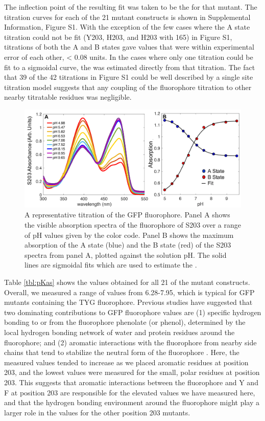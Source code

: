 The inflection point of the resulting fit was taken to be the \pKa{} for that mutant.
The titration curves for each of the 21 mutant constructs is shown in Supplemental Information, Figure S1.
With the exception of the few cases where the A state titration could not be fit (Y203, H203, and H203 with \pCNF{} 165) in Figure S1, titrations of both the A and B states gave \pKa{} values that were within experimental error of each other, < 0.08 \pKa{} units.
In the cases where only one titration could be fit to a sigmoidal curve, the \pKa{} was estimated directly from that titration.
The fact that 39 of the 42 titrations in Figure S1 could be well described by a single site titration model suggests that any coupling of the fluorophore titration to other nearby titratable residues was negligible. 

\begin{figure}
    \center
    \includegraphics[width=\double]{figures-gfp-pKa/absorption_titrations.png}
    \caption{
        A representative titration of the GFP fluorophore. 
        Panel A shows the visible absorption spectra of the fluorophore of S203 over a range of pH values given by the color code. 
        Panel B shows the maximum absorption of the A state (blue) and the B state (red) of the S203 spectra from panel A, plotted against the solution pH. 
        The solid lines are sigmoidal fits which are used to estimate the \pKa{}.
    }
    \label{fig:abs_titrations}
\end{figure}

Table \ref{tbl:pKas} shows the \pKa{} values obtained for all 21 of the mutant constructs.
Overall, we measured a range of \pKa{} values from 6.28-7.95, which is typical for GFP mutants containing the TYG fluorophore.
Previous studies have suggested that two dominating contributions to GFP fluorophore \pKa{} values are (1) specific hydrogen bonding to or from the fluorophore phenolate (or phenol), determined by the local hydrogen bonding network of water and protein residues around the fluorophore; and (2) aromatic interactions with the fluorophore from nearby side chains that tend to stabilize the neutral form of the fluorophore \cite{Elsliger1999, Wachter1998}.
Here, the measured \pKa{} values tended to increase as we placed aromatic residues at position 203, and the lowest \pKa{} values were measured for the small, polar residues at position 203.
This suggests that aromatic interactions between the fluorophore and Y and F at position 203 are responsible for the elevated \pKa{} values we have measured here, and that the hydrogen bonding environment around the fluorophore might play a larger role in the \pKa{} values for the other position 203 mutants. 

